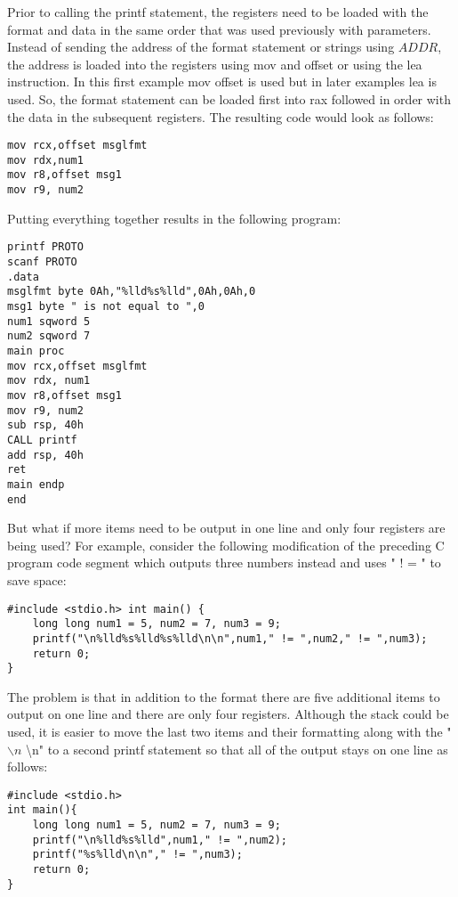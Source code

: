 \documentclass[10pt]{article}
\begin{document}
Prior to calling the printf statement, the registers need to be loaded with the format and data in the same order that was used previously with parameters. Instead of sending the address of the format statement or strings using $A D D R$, the address is loaded into the registers using mov and offset or using the lea instruction. In this first example mov offset is used but in later examples lea is used. So, the format statement can be loaded first into rax followed in order with the data in the subsequent registers. The resulting code would look as follows:

\begin{verbatim}
mov rcx,offset msglfmt
mov rdx,num1
mov r8,offset msg1
mov r9, num2
\end{verbatim}

Putting everything together results in the following program:

\begin{verbatim}
printf PROTO
scanf PROTO
.data
msglfmt byte 0Ah,"%lld%s%lld",0Ah,0Ah,0
msg1 byte " is not equal to ",0
num1 sqword 5
num2 sqword 7
main proc
mov rcx,offset msglfmt
mov rdx, num1
mov r8,offset msg1
mov r9, num2
sub rsp, 40h
CALL printf
add rsp, 40h
ret
main endp
end
\end{verbatim}

But what if more items need to be output in one line and only four registers are being used? For example, consider the following modification of the preceding C program code segment which outputs three numbers instead and uses " ! = " to save space:

\begin{verbatim}
#include <stdio.h> int main() {
    long long num1 = 5, num2 = 7, num3 = 9;
    printf("\n%lld%s%lld%s%lld\n\n",num1," != ",num2," != ",num3);
    return 0;
}
\end{verbatim}

The problem is that in addition to the format there are five additional items to output on one line and there are only four registers. Although the stack could be used, it is easier to move the last two items and their formatting along with the " $\backslash n$ \textbackslash n" to a second printf statement so that all of the output stays on one line as follows:

\begin{verbatim}
#include <stdio.h>
int main(){
    long long num1 = 5, num2 = 7, num3 = 9;
    printf("\n%lld%s%lld",num1," != ",num2);
    printf("%s%lld\n\n"," != ",num3);
    return 0;
}
\end{verbatim}
\end{document}
